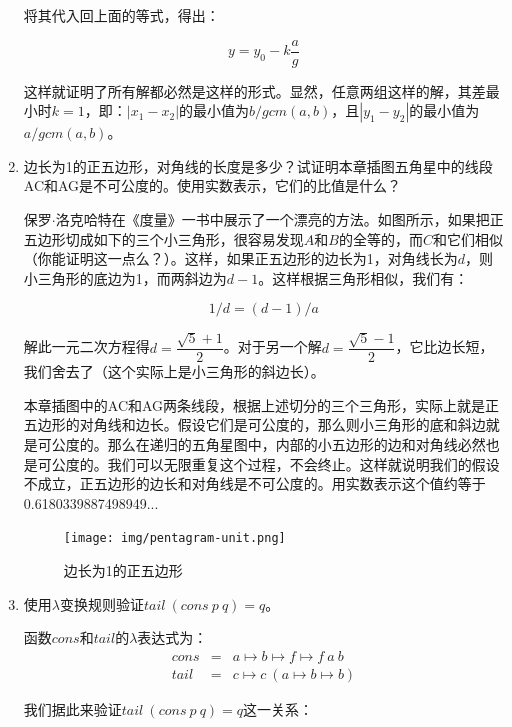 \documentclass[UTF8]{article}
\begin{document}
\begin{enumerate}
将其代入回上面的等式，得出：

\[
y = y_0 - k \dfrac{a}{g}
\]

这样就证明了所有解都必然是这样的形式。显然，任意两组这样的解，其差最小时$k = 1$，即：$|x_1 - x_2|$的最小值为$b/gcm(a, b)$，且$|y_1 - y_2|$的最小值为$a/gcm(a, b)$。

\item 边长为1的正五边形，对角线的长度是多少？试证明本章插图五角星中的线段AC和AG是不可公度的。使用实数表示，它们的比值是什么？

保罗$\cdot$洛克哈特在《度量》一书中\cite{Lockhart2012}展示了一个漂亮的方法。如图所示，如果把正五边形切成如下的三个小三角形，很容易发现$A$和$B$的全等的，而$C$和它们相似（你能证明这一点么？）。这样，如果正五边形的边长为1，对角线长为$d$，则小三角形的底边为1，而两斜边为$d - 1$。这样根据三角形相似，我们有：

\[
  1 / d = (d - 1) / a
\]

解此一元二次方程得$d = \dfrac{\sqrt{5} + 1}{2}$。对于另一个解$d = \dfrac{\sqrt{5} - 1}{2}$，它比边长短，我们舍去了（这个实际上是小三角形的斜边长）。

本章插图中的AC和AG两条线段，根据上述切分的三个三角形，实际上就是正五边形的对角线和边长。假设它们是可公度的，那么则小三角形的底和斜边就是可公度的。那么在递归的五角星图中，内部的小五边形的边和对角线必然也是可公度的。我们可以无限重复这个过程，不会终止。这样就说明我们的假设不成立，正五边形的边长和对角线是不可公度的。用实数表示这个值约等于0.6180339887498949...

\begin{figure}[htbp]
 \centering
 \texttt{[image: img/pentagram-unit.png]}
 \captionsetup{labelformat=empty}
 \caption{边长为1的正五边形}
 \label{fig:pentagram-unit}
\end{figure}

\item 使用$\lambda$变换规则验证$tail\ (cons\ p\ q) = q$。

函数$cons$和$tail$的$\lambda$表达式为：
\[
\begin{array}{rcl}
cons & = & a \mapsto b \mapsto f \mapsto f\ a\ b \\
tail & = & c \mapsto c\ (a \mapsto b \mapsto b)
\end{array}
\]

我们据此来验证$tail\ (cons\ p\ q) = q$这一关系：


\end{enumerate}
\end{document}
